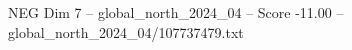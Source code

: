 \begin{textsample}{NEG Dim 7 – global\_north\_2024\_04 – Score -11.00 – global\_north\_2024\_04/107737479.txt}
\end{textsample}
